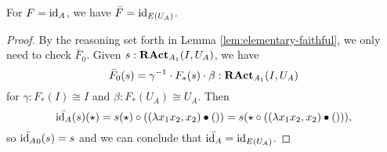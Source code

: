 \begin{remark}





\end{remark}

\begin{lemma}
  For $ F = \text{id}_{A} $, we have $ \bar F = \text{id}_{E(U_A)} $.
\end{lemma}
\begin{proof}
  By the reasoning set forth in Lemma \ref{lem:elementary-faithful}, we only need to check $ \bar F_0 $. Given $ s : \mathbf{RAct}_{A_1}(I, U_A) $, we have
  \[ \bar F_0(s) = \gamma^{-1} \cdot F_*(s) \cdot \beta: \mathbf{RAct}_{A_1}(I, U_A) \]
  for $ \gamma: F_*(I) \cong I $ and $ \beta: F_*(U_A) \cong U_A $. Then
  \[
    \bar{\text{id}_{A}}(s)(\star) = s(\star) \circ ((\lambda x_1 x_2, x_2) \bullet ()) = s(\star \circ ((\lambda x_1 x_2, x_2) \bullet ())),
  \]
  so $ \bar{\text{id}_{A}}_0(s) = s $ and we can conclude that $ \bar{\text{id}_{A}} = \text{id}_{E(U_A)} $.
\end{proof}

